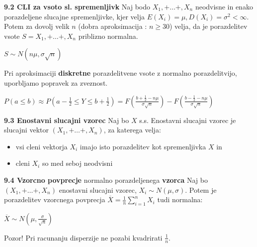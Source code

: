 \documentclass{article}
\begin{document}
\begin{multicols}{3}
\textbf{9.2 CLI za vsoto sl. spremenljivk}
Naj bodo $X_1, + \dots +, X_n$ neodvisne in enako porazdeljene
slucajne spremenljivke, kjer velja $E(X_i) = \mu, D(X_i) = \sigma^2 < \infty$. Potem za 
dovolj velik $n$ (dobra aproksimacija : $n \geq 30$)  velja, da je porazdelitev vsote
$S = X_1, + \dots +, X_n$ priblizno normalna.

\begin{center}
    \begin{math}
        S \sim  N(n \mu, \sigma \sqrt{n})
    \end{math}
\end{center}

Pri aproksimaciji \textbf{diskretne} porazdelitvene vsote z normalno porazdelitvijo, uporbljamo
popravek za zveznost.

\begin{center}
    \begin{math}
        P(a \leq b) \approx P(a - \frac{1}{2} \leq Y \leq b + \frac{1}{2}) =
        F(
            \frac{b + \frac{1}{2} - n \mu}{\sigma \sqrt{n}}
        ) -
        F(
            \frac{b - \frac{1}{2} - n \mu}{\sigma \sqrt{n}}
        )
    \end{math}
\end{center}

\textbf{9.3 Enostavni slucajni vzorec}
Naj bo $X$ s.s. Enostavni slucajni vzorec je slucajni vektor $(X_1, + \dots +, X_n)$,
za katerega velja:
\begin{itemize}
    \item vsi cleni vektorja $X_i$ imajo isto porazdelitev kot spremenljivka $X$ in
    \item cleni $X_i$ so med seboj neodvisni
\end{itemize}

\textbf{9.4 Vzorcno povprecje} normalno porazdeljenega \textbf{vzorca}
Naj bo  $(X_1, + \dots +, X_n)$ enostavni slucajni vzorec, $X_i \sim N(\mu, \sigma)$.
Potem je porazdelitev vzorcnega povprecja $\overline{X} = \frac{1}{n} \sum_{i = 1}^{n} X_i$
tudi normalna:
\begin{center}
    \begin{math}
        \overline{X} \sim N(\mu, \frac{\sigma}{\sqrt{n}})
    \end{math}
\end{center}

Pozor! Pri racunanju disperzije ne pozabi kvadrirati \textbf{$\frac{1}{n}$}.


\end{multicols}
\end{document}
